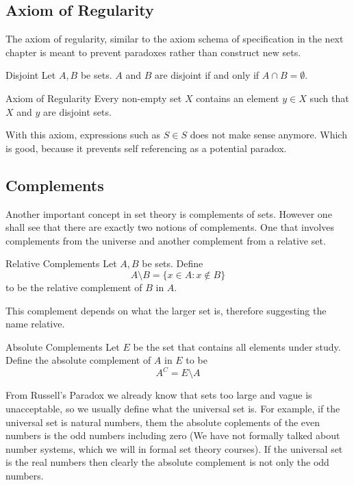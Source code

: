 \documentclass[a4paper]{article}
\begin{document}
\subsection{Axiom of Regularity}
The axiom of regularity, similar to the axiom schema of specification in the next chapter is meant to prevent paradoxes rather than construct new sets. 

\begin{defn}{Disjoint}{} Let $A,B$ be sets. $A$ and $B$ are disjoint if and only if $A\cap B=\emptyset$. 
\end{defn}

\begin{axm}{Axiom of Regularity}{} Every non-empty set $X$ contains an element $y\in X$ such that $X$ and $y$ are disjoint sets. 
\end{axm}

With this axiom, expressions such as $S\in S$ does not make sense anymore. Which is good, because it prevents self referencing as a potential paradox. 

\subsection{Complements}
Another important concept in set theory is complements of sets. However one shall see that there are exactly two notions of complements. One that involves complements from the universe and another complement from a relative set. 

\begin{defn}{Relative Complements}{} Let $A,B$ be sets. Define $$A\setminus B=\{x\in A:x\notin B\}$$ to be the relative complement of $B$ in $A$. 
\end{defn}

This complement depends on what the larger set is, therefore suggesting the name relative. 

\begin{defn}{Absolute Complements}{} Let $E$ be the set that contains all elements under study. Define the absolute complement of $A$ in $E$ to be $$A^C=E\setminus A$$
\end{defn}

From Russell's Paradox we already know that sets too large and vague is unacceptable, so we usually define what the universal set is. For example, if the universal set is natural numbers, them the absolute coplements of the even numbers is the odd numbers including zero (We have not formally talked about number systems, which we will in formal set theory courses). If the universal set is the real numbers then clearly the absolute complement is not only the odd numbers. \\
\end{document}
